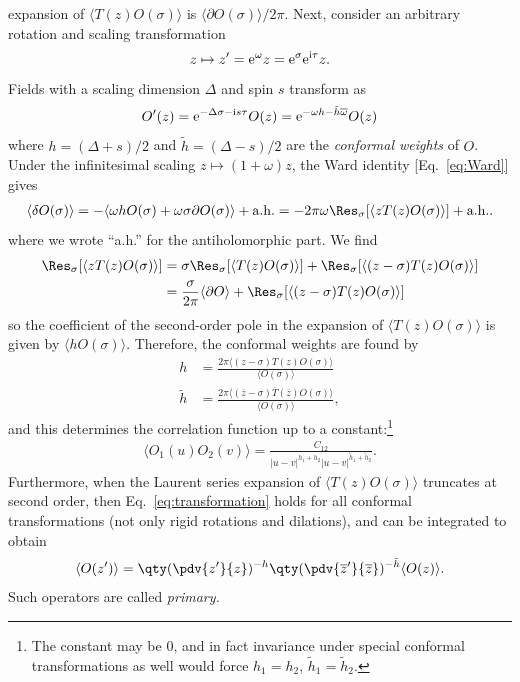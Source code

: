 expansion of $\langle T(z) O(\sigma)\rangle$ is $\langle  \partial O(\sigma)
\rangle/2\pi$. 
Next, consider an arbitrary rotation and scaling transformation
\begin{align}
z \mapsto z' = \mathrm e^{\omega}z = \mathrm e^{\sigma}\mathrm e^{\mathrm i \tau}z.
\end{align}
Fields with a scaling dimension
$\Delta$ and spin $s$ transform as
\begin{align}
O'(z) = \mathrm e^{-\Delta \sigma - \mathrm i s \tau}O(z) = \mathrm e^{-\omega h - \tilde h \overline \omega}O(z)
\end{align}
where $h = (\Delta + s)/2$ and $\tilde h = (\Delta - s)/2$ are the
\emph{conformal weights} of $O$. Under the
infinitesimal scaling $z \mapsto (1+\omega) z$,
the Ward identity [Eq.~\eqref{eq:Ward}] gives
\begin{align}
\langle  \delta O(\sigma) \rangle = -\langle \omega h O(\sigma) + \omega \sigma \partial O(\sigma) \rangle+ \text{a.h.} = -2\pi\omega \Res_{\sigma}[\langle z T(z)O(\sigma) \rangle] + \text{a.h.}.\label{eq:transformation}
\end{align}
where we wrote ``a.h.'' for the antiholomorphic part.
We find
\begin{align}
  \Res_{\sigma}[\langle z T(z)O(\sigma) \rangle] &= \sigma\Res_{\sigma}[\langle  T(z)O(\sigma) \rangle] + \Res_{\sigma}[\langle (z-\sigma)T(z)O(\sigma) \rangle] \\
  &= \frac{\sigma}{2\pi}\langle  \partial O \rangle + \Res_{\sigma}[\langle (z-\sigma)T(z)O(\sigma) \rangle]
\end{align}
so the coefficient of the second-order pole in the expansion of $\langle  T(z)O(\sigma) \rangle$ is
given by $\langle  hO(\sigma) \rangle$. Therefore, the conformal weights are
found by
\begin{align}
  h &=  \frac{2\pi\langle  (z-\sigma)T(z)O(\sigma) \rangle}{\langle  O(\sigma) \rangle} \\
  \tilde h &=  \frac{2\pi\langle  (\overline z-\sigma)\overline T(\overline z)O(\sigma) \rangle}{\langle  O(\sigma) \rangle},\label{eq:determine-conformal-weight}
\end{align}
and this determines the correlation function up to a constant:\footnote{
The constant may be $0$, and in fact invariance under special conformal
transformations as well would force $h_1 = h_2$, $\tilde h_1 = \tilde h_2$.
}
\begin{align}
  \langle  O_1(u)O_2(v) \rangle = \frac{C_{12}}{|u-v|^{h_1+h_2}|u-v|^{\tilde h_1 + \tilde h_2}}.
  \label{eq:correlator}
\end{align}
Furthermore, when the Laurent series expansion of $\langle T(z)O(\sigma)\rangle$
truncates at second order, then Eq.~\eqref{eq:transformation} holds for all
conformal transformations (not only rigid rotations and dilations), and can be
integrated to obtain
\begin{align}
\langle  O(z') \rangle = \qty(\pdv{z'}{z})^{-h}\qty(\pdv{\overline z'}{\overline z})^{-\tilde h}\langle  O(z) \rangle.\label{eq:defprimary}
\end{align}
Such operators are called \emph{primary.}

